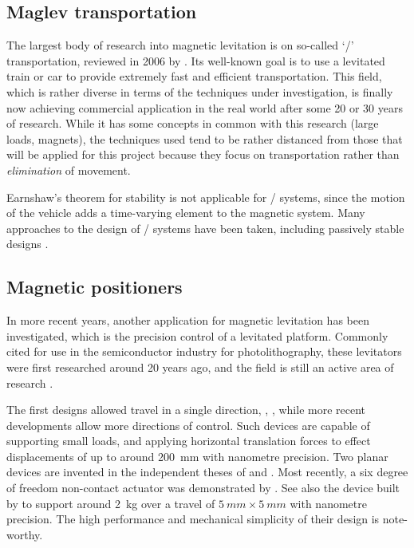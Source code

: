 \subsection{Maglev transportation}

The largest body of research into magnetic levitation is on so-called `\maglev/'
transportation, reviewed in 2006 by \textcite{lee2006}.
Its well-known goal is to use a levitated train or car to
provide extremely fast and efficient transportation.
This field, which is
rather diverse in terms of the techniques under investigation, is finally now
achieving commercial application in the real world after some 20 or 30 years
of research.
While it has some concepts in common with this research (large
loads, magnets), the techniques used tend to be rather distanced from those
that will be applied for this project because they focus on transportation
rather than \emph{elimination} of movement.

Earnshaw's theorem for stability is not applicable for \maglev/ systems, since the motion of the vehicle adds a time-varying element to the magnetic system.
Many approaches to the design of \maglev/ systems have been taken, including passively stable designs \cite{musolino2009}.

\subsection{Magnetic positioners}

In more recent years, another application for magnetic levitation has been
investigated, which is the precision control of a levitated platform.
Commonly
cited for use in the semiconductor industry for photolithography, these
levitators were first researched around 20 years ago, and the field is still an active area of research \cite{fulford2008,fulford2009}.

The first designs allowed travel in a single direction, \eg,
\textcite{trumper1992}, while more recent developments allow more directions
of control.
Such devices are capable of supporting small loads, and applying
horizontal translation forces to effect displacements of up to around
\SI{200}{mm} with nanometre precision.
Two planar devices are invented in the
independent theses of \textcite{kim1997} and \textcite{molenaar2000}.
Most
recently, a six degree of freedom non-contact actuator was demonstrated by
\textcite{verma2004}.
See also the device built by \textcite{kim2007} to
support around \SI{2}{kg} over a travel of $\SI{5}{mm}\times\SI{5}{mm}$ with
nanometre precision.
The high performance and mechanical simplicity of their
design is note-worthy.

